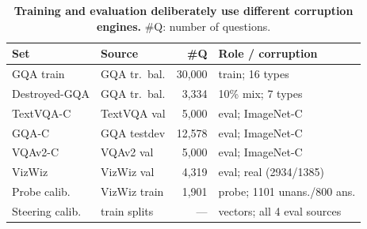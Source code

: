 \begin{table}[tb]
\centering
\caption{\textbf{Training and evaluation deliberately use different corruption engines.}
\#Q: number of questions.}
\label{tab:data}
\footnotesize
\setlength{\tabcolsep}{3pt}
\begin{tabular}{@{}llrl@{}}
\toprule
Set & Source & \#Q & Role / corruption \\
\midrule
GQA train      & GQA tr.\ bal.  & 30{,}000 & train; 16 types \\
Destroyed-GQA  & GQA tr.\ bal.  & 3{,}334  & 10\% mix; 7 types \\
TextVQA-C      & TextVQA val    & 5{,}000  & eval; ImageNet-C \\
GQA-C          & GQA testdev    & 12{,}578 & eval; ImageNet-C \\
VQAv2-C        & VQAv2 val      & 5{,}000  & eval; ImageNet-C \\
VizWiz         & VizWiz val     & 4{,}319  & eval; real (2934/1385) \\
Probe calib.   & VizWiz train   & 1{,}901  & probe; 1101 unans./800 ans. \\
Steering calib.& train splits   & ---      & vectors; all 4 eval sources \\
\bottomrule
\end{tabular}
\end{table}

